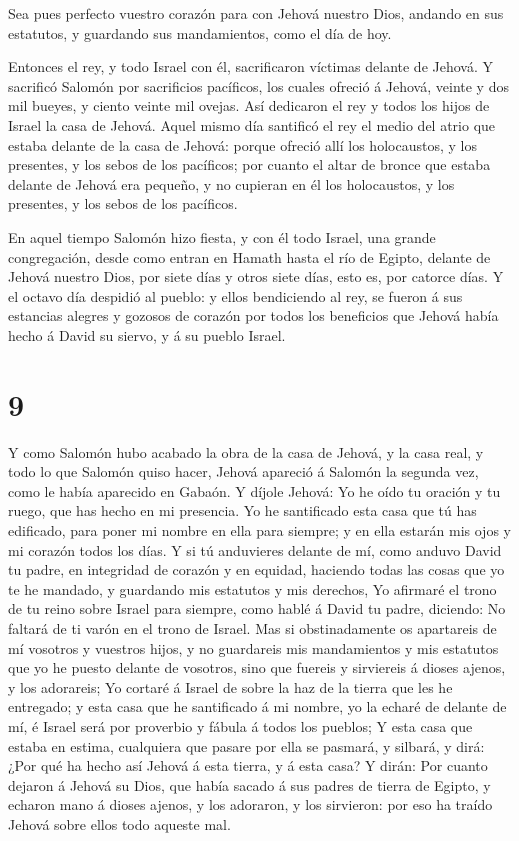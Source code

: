  Sea pues perfecto vuestro corazón para con Jehová nuestro
Dios, andando en sus estatutos, y guardando sus mandamientos, como el
día de hoy.

 Entonces el rey, y todo Israel con él, sacrificaron
víctimas delante de Jehová.  Y sacrificó Salomón por
sacrificios pacíficos, los cuales ofreció á Jehová, veinte y dos mil
bueyes, y ciento veinte mil ovejas. Así dedicaron el rey y todos los
hijos de Israel la casa de Jehová.  Aquel mismo día
santificó el rey el medio del atrio que estaba delante de la casa de
Jehová: porque ofreció allí los holocaustos, y los presentes, y los
sebos de los pacíficos; por cuanto el altar de bronce que estaba delante
de Jehová era pequeño, y no cupieran en él los holocaustos, y los
presentes, y los sebos de los pacíficos.

 En aquel tiempo Salomón hizo fiesta, y con él todo Israel,
una grande congregación, desde como entran en Hamath hasta el río de
Egipto, delante de Jehová nuestro Dios, por siete días y otros siete
días, esto es, por catorce días.  Y el octavo día despidió
al pueblo: y ellos bendiciendo al rey, se fueron á sus estancias alegres
y gozosos de corazón por todos los beneficios que Jehová había hecho á
David su siervo, y á su pueblo Israel.

\hypertarget{section-8}{%
\section{9}\label{section-8}}

 Y como Salomón hubo acabado la obra de la casa de Jehová, y
la casa real, y todo lo que Salomón quiso hacer,  Jehová
apareció á Salomón la segunda vez, como le había aparecido en Gabaón.
 Y díjole Jehová: Yo he oído tu oración y tu ruego, que has
hecho en mi presencia. Yo he santificado esta casa que tú has edificado,
para poner mi nombre en ella para siempre; y en ella estarán mis ojos y
mi corazón todos los días.  Y si tú anduvieres delante de
mí, como anduvo David tu padre, en integridad de corazón y en equidad,
haciendo todas las cosas que yo te he mandado, y guardando mis estatutos
y mis derechos,  Yo afirmaré el trono de tu reino sobre
Israel para siempre, como hablé á David tu padre, diciendo: No faltará
de ti varón en el trono de Israel.  Mas si obstinadamente os
apartareis de mí vosotros y vuestros hijos, y no guardareis mis
mandamientos y mis estatutos que yo he puesto delante de vosotros, sino
que fuereis y sirviereis á dioses ajenos, y los adorareis; 
Yo cortaré á Israel de sobre la haz de la tierra que les he entregado; y
esta casa que he santificado á mi nombre, yo la echaré de delante de mí,
é Israel será por proverbio y fábula á todos los pueblos;  Y
esta casa que estaba en estima, cualquiera que pasare por ella se
pasmará, y silbará, y dirá: ¿Por qué ha hecho así Jehová á esta tierra,
y á esta casa?  Y dirán: Por cuanto dejaron á Jehová su
Dios, que había sacado á sus padres de tierra de Egipto, y echaron mano
á dioses ajenos, y los adoraron, y los sirvieron: por eso ha traído
Jehová sobre ellos todo aqueste mal.

